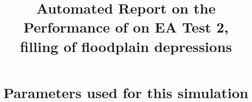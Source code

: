 \documentclass[11pt,a4paper]{article}%
\begin{document}
 

\title{Automated Report on the Performance of \anuga{} on EA Test 2, filling of floodplain depressions}
\maketitle




\section{Parameters used for this simulation}






\end{document}
